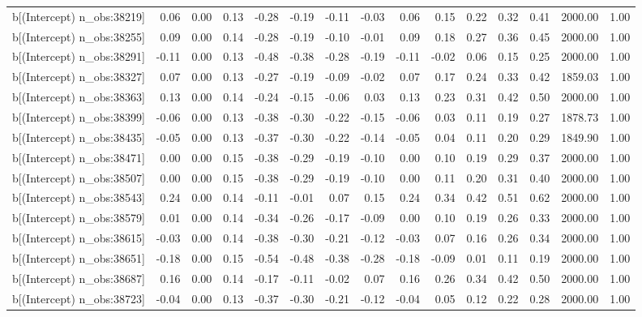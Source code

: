\begin{table}[ht]
\begin{tabular}{rrrrrrrrrrrrrrr}
  b[(Intercept) n\_obs:38219] & 0.06 & 0.00 & 0.13 & -0.28 & -0.19 & -0.11 & -0.03 & 0.06 & 0.15 & 0.22 & 0.32 & 0.41 & 2000.00 & 1.00 \\ 
  b[(Intercept) n\_obs:38255] & 0.09 & 0.00 & 0.14 & -0.28 & -0.19 & -0.10 & -0.01 & 0.09 & 0.18 & 0.27 & 0.36 & 0.45 & 2000.00 & 1.00 \\ 
  b[(Intercept) n\_obs:38291] & -0.11 & 0.00 & 0.13 & -0.48 & -0.38 & -0.28 & -0.19 & -0.11 & -0.02 & 0.06 & 0.15 & 0.25 & 2000.00 & 1.00 \\ 
  b[(Intercept) n\_obs:38327] & 0.07 & 0.00 & 0.13 & -0.27 & -0.19 & -0.09 & -0.02 & 0.07 & 0.17 & 0.24 & 0.33 & 0.42 & 1859.03 & 1.00 \\ 
  b[(Intercept) n\_obs:38363] & 0.13 & 0.00 & 0.14 & -0.24 & -0.15 & -0.06 & 0.03 & 0.13 & 0.23 & 0.31 & 0.42 & 0.50 & 2000.00 & 1.00 \\ 
  b[(Intercept) n\_obs:38399] & -0.06 & 0.00 & 0.13 & -0.38 & -0.30 & -0.22 & -0.15 & -0.06 & 0.03 & 0.11 & 0.19 & 0.27 & 1878.73 & 1.00 \\ 
  b[(Intercept) n\_obs:38435] & -0.05 & 0.00 & 0.13 & -0.37 & -0.30 & -0.22 & -0.14 & -0.05 & 0.04 & 0.11 & 0.20 & 0.29 & 1849.90 & 1.00 \\ 
  b[(Intercept) n\_obs:38471] & 0.00 & 0.00 & 0.15 & -0.38 & -0.29 & -0.19 & -0.10 & 0.00 & 0.10 & 0.19 & 0.29 & 0.37 & 2000.00 & 1.00 \\ 
  b[(Intercept) n\_obs:38507] & 0.00 & 0.00 & 0.15 & -0.38 & -0.29 & -0.19 & -0.10 & 0.00 & 0.11 & 0.20 & 0.31 & 0.40 & 2000.00 & 1.00 \\ 
  b[(Intercept) n\_obs:38543] & 0.24 & 0.00 & 0.14 & -0.11 & -0.01 & 0.07 & 0.15 & 0.24 & 0.34 & 0.42 & 0.51 & 0.62 & 2000.00 & 1.00 \\ 
  b[(Intercept) n\_obs:38579] & 0.01 & 0.00 & 0.14 & -0.34 & -0.26 & -0.17 & -0.09 & 0.00 & 0.10 & 0.19 & 0.26 & 0.33 & 2000.00 & 1.00 \\ 
  b[(Intercept) n\_obs:38615] & -0.03 & 0.00 & 0.14 & -0.38 & -0.30 & -0.21 & -0.12 & -0.03 & 0.07 & 0.16 & 0.26 & 0.34 & 2000.00 & 1.00 \\ 
  b[(Intercept) n\_obs:38651] & -0.18 & 0.00 & 0.15 & -0.54 & -0.48 & -0.38 & -0.28 & -0.18 & -0.09 & 0.01 & 0.11 & 0.19 & 2000.00 & 1.00 \\ 
  b[(Intercept) n\_obs:38687] & 0.16 & 0.00 & 0.14 & -0.17 & -0.11 & -0.02 & 0.07 & 0.16 & 0.26 & 0.34 & 0.42 & 0.50 & 2000.00 & 1.00 \\ 
  b[(Intercept) n\_obs:38723] & -0.04 & 0.00 & 0.13 & -0.37 & -0.30 & -0.21 & -0.12 & -0.04 & 0.05 & 0.12 & 0.22 & 0.28 & 2000.00 & 1.00 \\ 

\end{tabular}
\end{table}
